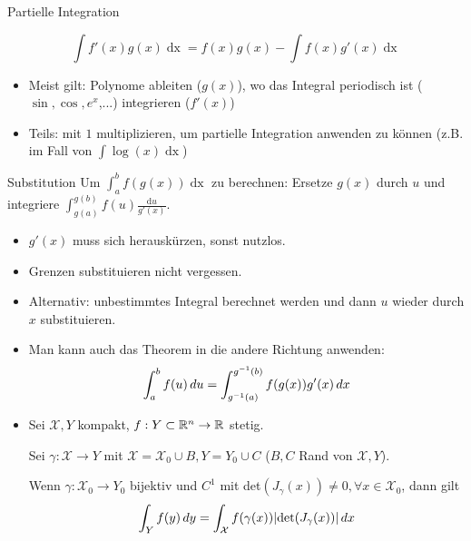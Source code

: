 \begin{mainbox}{Partielle Integration}
	
	$$\int f'(x) g(x) \mathop{dx} = f(x)g(x) - \int f(x) g'(x) \mathop{dx}$$
\end{mainbox}
\begin{itemize}
	\item Meist gilt: Polynome ableiten ($g(x)$), wo das Integral periodisch ist ($\sin, \cos, e^x$,...) integrieren ($f'(x)$)
	\item Teils: mit $1$ multiplizieren, um partielle Integration anwenden zu können (z.B. im Fall von $\int \log(x) \mathop{dx}$)
\end{itemize}
\begin{mainbox}{Substitution}
	Um $\int_a^b f(g(x)) \mathop{dx}$ zu berechnen: Ersetze $g(x)$ durch $u$ und integriere $\int_{g(a)}^{g(b)} f(u) \frac{\text{d}u}{g'(x)}$.
\end{mainbox}
\begin{itemize}
	\item $g'(x)$ muss sich herauskürzen, sonst nutzlos.
	\item Grenzen substituieren nicht vergessen.
	\item Alternativ: unbestimmtes Integral berechnet werden und dann $u$ wieder durch $x$ substituieren.
	\item Man kann auch das Theorem in die andere Richtung anwenden: \[\int_a^b f(u) \mathop{du} = \int_{g^{-1}(a)}^{g^{-1}(b)}f(g(x))g'(x) \mathop{dx}\]
	\item Sei $\mathcal{X}, Y$ kompakt, $f: Y \subset \mathbb{R}^n \to \mathbb{R}$ stetig. 
	
	Sei $\gamma: \mathcal{X} \to Y$ mit $\mathcal{X} = \mathcal{X}_0 \cup B, Y = Y_0 \cup C$ ($B, C$ Rand von $\mathcal{X}, Y$). 
	
	Wenn $\gamma: \mathcal{X}_0 \to Y_0$ bijektiv und $C^1$ mit det$(J_\gamma(x)) \neq 0, \forall x \in \mathcal{X}_0$, dann gilt 
	\[\int_Y f(y)\mathop{dy} = \int_{\mathcal{X}} f(\gamma(x))|\text{det}(J_\gamma(x))|\mathop{dx}\]
\end{itemize}

